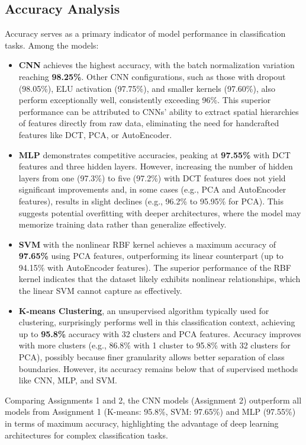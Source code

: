 \documentclass[a4paper,12pt]{article}
\begin{document}
\subsection{Accuracy Analysis}
Accuracy serves as a primary indicator of model performance in classification tasks. Among the models:

\begin{itemize}
    \item \textbf{CNN} achieves the highest accuracy, with the batch normalization variation reaching \textbf{98.25\%}. Other CNN configurations, such as those with dropout (98.05\%), ELU activation (97.75\%), and smaller kernels (97.60\%), also perform exceptionally well, consistently exceeding 96\%. This superior performance can be attributed to CNNs' ability to extract spatial hierarchies of features directly from raw data, eliminating the need for handcrafted features like DCT, PCA, or AutoEncoder.
    
    \item \textbf{MLP} demonstrates competitive accuracies, peaking at \textbf{97.55\%} with DCT features and three hidden layers. However, increasing the number of hidden layers from one (97.3\%) to five (97.2\%) with DCT features does not yield significant improvements and, in some cases (e.g., PCA and AutoEncoder features), results in slight declines (e.g., 96.2\% to 95.95\% for PCA). This suggests potential overfitting with deeper architectures, where the model may memorize training data rather than generalize effectively.
    
    \item \textbf{SVM} with the nonlinear RBF kernel achieves a maximum accuracy of \textbf{97.65\%} using PCA features, outperforming its linear counterpart (up to 94.15\% with AutoEncoder features). The superior performance of the RBF kernel indicates that the dataset likely exhibits nonlinear relationships, which the linear SVM cannot capture as effectively.
    
    \item \textbf{K-means Clustering}, an unsupervised algorithm typically used for clustering, surprisingly performs well in this classification context, achieving up to \textbf{95.8\%} accuracy with 32 clusters and PCA features. Accuracy improves with more clusters (e.g., 86.8\% with 1 cluster to 95.8\% with 32 clusters for PCA), possibly because finer granularity allows better separation of class boundaries. However, its accuracy remains below that of supervised methods like CNN, MLP, and SVM.\\
\end{itemize}
Comparing Assignments 1 and 2, the CNN models (Assignment 2) outperform all models from Assignment 1 (K-means: 95.8\%, SVM: 97.65\%) and MLP (97.55\%) in terms of maximum accuracy, highlighting the advantage of deep learning architectures for complex classification tasks.
\end{document}
